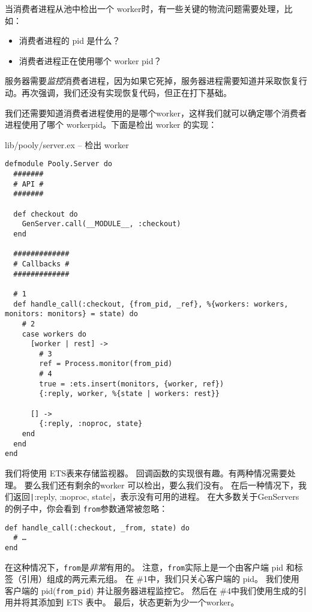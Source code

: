 当消费者进程从池中检出一个 worker时，有一些关键的物流问题需要处理，比如：

\begin{itemize}

\item  消费者进程的 pid 是什么？
\item  消费者进程正在使用哪个 worker pid？
\end{itemize}

服务器需要\emph{监控}消费者进程，因为如果它死掉，服务器进程需要知道并采取恢复行动。再次强调，我们还没有实现恢复代码，但正在打下基础。

我们还需要知道消费者进程使用的是哪个worker，这样我们就可以确定哪个消费者进程使用了哪个 workerpid。下面是检出 worker 的实现：

\begin{code}{lib/pooly/server.ex -- 检出 worker}

\begin{verbatim}
defmodule Pooly.Server do
  #######
  # API #
  #######

  def checkout do
    GenServer.call(__MODULE__, :checkout)
  end

  #############
  # Callbacks #
  #############

  # 1
  def handle_call(:checkout, {from_pid, _ref}, %{workers: workers, monitors: monitors} = state) do
    # 2
    case workers do
      [worker | rest] ->
        # 3
        ref = Process.monitor(from_pid)
        # 4
        true = :ets.insert(monitors, {worker, ref})
        {:reply, worker, %{state | workers: rest}}

      [] ->
        {:reply, :noproc, state}
    end
  end
end
\end{verbatim}
\end{code}

我们将使用 ETS表来存储监视器。
回调函数的实现很有趣。有两种情况需要处理。
要么我们还有剩余的worker 可以检出，要么我们没有。
在后一种情况下，我们返回\texttt|{:reply, :noproc, state}|，表示没有可用的进程。
在大多数关于GenServers 的例子中，你会看到 \texttt{from}参数通常被忽略：

\begin{code}{}
\begin{verbatim}
def handle_call(:checkout, _from, state) do
  # …
end
\end{verbatim}
\end{code}

在这种情况下，\texttt{from}是\emph{非常}有用的。
注意，\texttt{from}实际上是一个由客户端 pid 和标签（引用）组成的两元素元组。
在 \#1中，我们只关心客户端的 pid。
我们使用客户端的 pid(\texttt{from\_pid}) 并让服务器进程监控它。
然后在 \#4中我们使用生成的引用并将其添加到 ETS 表中。
最后，状态更新为少一个worker。

